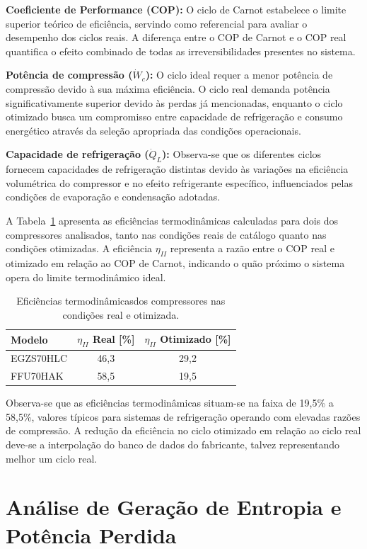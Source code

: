 \textbf{Coeficiente de Performance (COP):} O ciclo de Carnot estabelece o limite superior teórico de eficiência, servindo como referencial para avaliar o desempenho dos ciclos reais. A diferença entre o COP de Carnot e o COP real quantifica o efeito combinado de todas as irreversibilidades presentes no sistema.

\textbf{Potência de compressão ($\dot{W}_c$):} O ciclo ideal requer a menor potência de compressão devido à sua máxima eficiência. O ciclo real demanda potência significativamente superior devido às perdas já mencionadas, enquanto o ciclo otimizado busca um compromisso entre capacidade de refrigeração e consumo energético através da seleção apropriada das condições operacionais.

\textbf{Capacidade de refrigeração ($\dot{Q}_L$):} Observa-se que os diferentes ciclos fornecem capacidades de refrigeração distintas devido às variações na eficiência volumétrica do compressor e no efeito refrigerante específico, influenciados pelas condições de evaporação e condensação adotadas.

A Tabela~\ref{tab:eficiencias termo} apresenta as eficiências termodinâmicas calculadas para dois dos compressores analisados, tanto nas condições reais de catálogo quanto nas condições otimizadas. A eficiência $\eta_{II}$ representa a razão entre o COP real e otimizado em relação ao COP de Carnot, indicando o quão próximo o sistema opera do limite termodinâmico ideal.

\begin{table}[ht]
\centering
\begin{tabular}{|l|c|c|}
\hline
\textbf{Modelo} & \textbf{$\eta_{II}$ Real [\%]} & \textbf{$\eta_{II}$ Otimizado [\%]} \\ \hline
EGZS70HLC & 46,3 & 29,2 \\ \hline
FFU70HAK & 58,5 & 19,5 \\ \hline
\end{tabular}
\caption{Eficiências termodinâmicasdos compressores nas condições real e otimizada.}
\label{tab:eficiencias termo}
\end{table}

Observa-se que as eficiências termodinâmicas situam-se na faixa de 19,5\% a 58,5\%, valores típicos para sistemas de refrigeração operando com elevadas razões de compressão. A redução da eficiência no ciclo otimizado em relação ao ciclo real deve-se a interpolação do banco de dados do fabricante, talvez representando melhor um ciclo real.

\section{Análise de Geração de Entropia e Potência Perdida}

